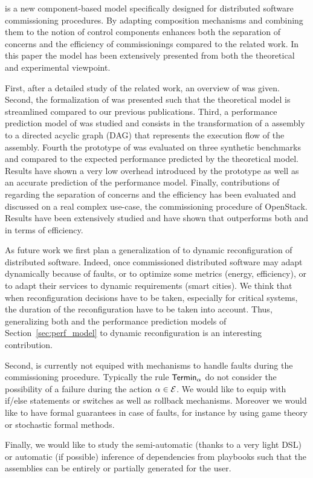 \mad is a new component-based model specifically designed for
distributed software commissioning procedures. By adapting composition
mechanisms and combining them to the notion of control components \mad
enhances both the separation of concerns and the efficiency of
commissionings compared to the related work. In this paper the \mad
model has been extensively presented from both the theoretical and
experimental viewpoint.

First, after a detailed study of the related work, an overview of \mad
was given. Second, the formalization of \mad was presented such that
the theoretical model is streamlined compared to our previous
publications. Third, a performance prediction model of \mad was
studied and consists in the transformation of a \mad assembly to a
directed acyclic graph (DAG) that represents the execution flow of the
assembly. Fourth the prototype of \mad was evaluated on three
synthetic benchmarks and compared to the expected performance
predicted by the theoretical model. Results have shown a very low
overhead introduced by the prototype as well as an accurate prediction
of the performance model. Finally, contributions of \mad regarding the
separation of concerns and the efficiency has been evaluated and
discussed on a real complex use-case, the commissioning procedure of
OpenStack. Results have been extensively studied and have shown that
\mad outperforms both \ansible and \aeolus in terms of efficiency.

As future work we first plan a generalization of \mad to dynamic
reconfiguration of distributed software. Indeed, once commissioned
distributed software may adapt dynamically because of faults, or to
optimize some metrics (\eg energy, efficiency), or to adapt their
services to dynamic requirements (\eg smart cities). We think that
when reconfiguration decisions have to be taken, especially for
critical systems, the duration of the reconfiguration have to be taken
into account. Thus, generalizing both \mad and the performance
prediction models of Section~\ref{sec:perf_model} to dynamic
reconfiguration is an interesting contribution.

Second, \mad is currently not equiped with mechanisms to handle faults
during the commissioning procedure. Typically the rule $\mathsf{Termin}_\alpha$
do not consider the possibility of a failure during the action
$\alpha \in \mathcal{E}$. We would like to equip \mad with if/else
statements or switches as well as rollback mechanisms. Moreover we
would like to have formal guarantees in case of faults, for instance
by using game theory or stochastic formal methods.

Finally, we would like to study the semi-automatic (thanks to a very
light DSL) or automatic (if possible) inference of dependencies from
\ansible playbooks such that the \mad assemblies can be entirely or
partially generated for the user.

  